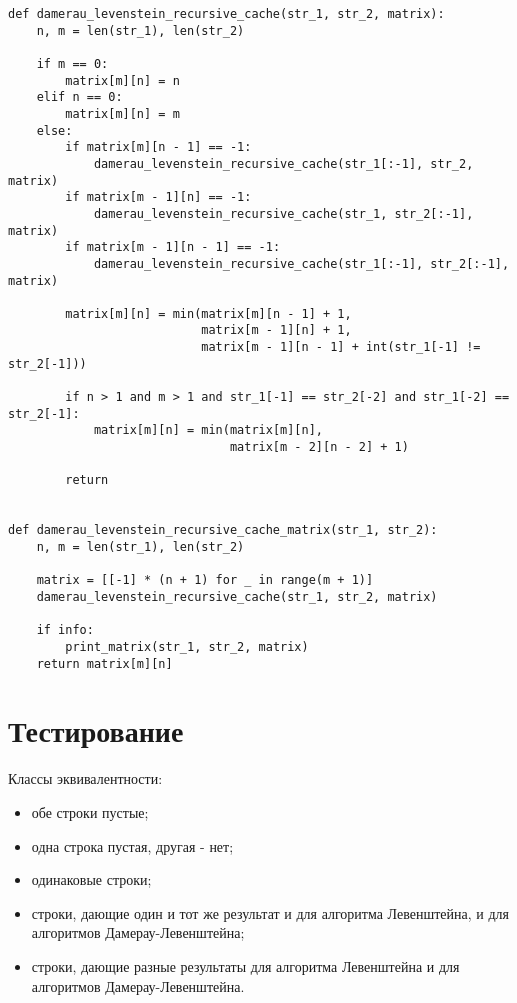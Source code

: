 \begin{center}
    \captionsetup{justification=raggedright,singlelinecheck=off}
    \begin{lstlisting}[label=lst:d_l_rec_cache,caption=Рекурсивный алгоритм поиска расстояния Дамерау-Левен- штейна с кешем]
def damerau_levenstein_recursive_cache(str_1, str_2, matrix):
    n, m = len(str_1), len(str_2)

    if m == 0:
        matrix[m][n] = n
    elif n == 0:
        matrix[m][n] = m
    else:
        if matrix[m][n - 1] == -1:
            damerau_levenstein_recursive_cache(str_1[:-1], str_2, matrix)
        if matrix[m - 1][n] == -1:
            damerau_levenstein_recursive_cache(str_1, str_2[:-1], matrix)
        if matrix[m - 1][n - 1] == -1:
            damerau_levenstein_recursive_cache(str_1[:-1], str_2[:-1], matrix)

        matrix[m][n] = min(matrix[m][n - 1] + 1,
                           matrix[m - 1][n] + 1,
                           matrix[m - 1][n - 1] + int(str_1[-1] != str_2[-1]))

        if n > 1 and m > 1 and str_1[-1] == str_2[-2] and str_1[-2] == str_2[-1]:
            matrix[m][n] = min(matrix[m][n],
                               matrix[m - 2][n - 2] + 1)

        return


def damerau_levenstein_recursive_cache_matrix(str_1, str_2):
    n, m = len(str_1), len(str_2)

    matrix = [[-1] * (n + 1) for _ in range(m + 1)]
    damerau_levenstein_recursive_cache(str_1, str_2, matrix)

    if info:
        print_matrix(str_1, str_2, matrix)
    return matrix[m][n]
\end{lstlisting}
\end{center}


\section{Тестирование}
Классы эквивалентности:

\begin{itemize}
    \item обе строки пустые;
    \item одна строка пустая, другая - нет;
    \item одинаковые строки;
    \item строки, дающие один и тот же результат и для алгоритма Левенштейна, и для алгоритмов Дамерау-Левенштейна;
    \item строки, дающие разные результаты для алгоритма Левенштейна и для алгоритмов Дамерау-Левенштейна.
\end{itemize}

